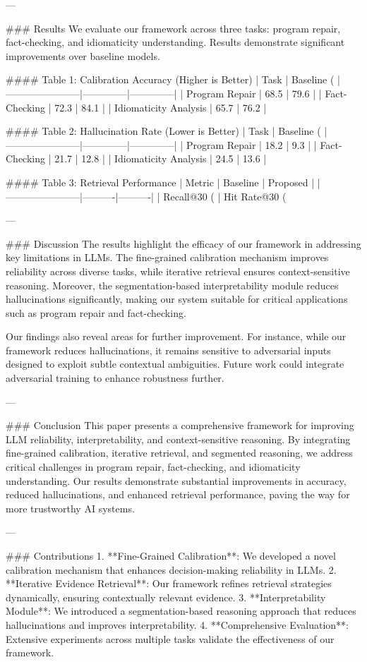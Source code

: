 ---

### Results
We evaluate our framework across three tasks: program repair, fact-checking, and idiomaticity understanding. Results demonstrate significant improvements over baseline models.

#### Table 1: Calibration Accuracy (Higher is Better)
| Task                  | Baseline (%
|-----------------------|--------------|--------------|
| Program Repair        | 68.5         | 79.6         |
| Fact-Checking         | 72.3         | 84.1         |
| Idiomaticity Analysis | 65.7         | 76.2         |

#### Table 2: Hallucination Rate (Lower is Better)
| Task                  | Baseline (%
|-----------------------|--------------|--------------|
| Program Repair        | 18.2         | 9.3          |
| Fact-Checking         | 21.7         | 12.8         |
| Idiomaticity Analysis | 24.5         | 13.6         |

#### Table 3: Retrieval Performance
| Metric                | Baseline | Proposed |
|-----------------------|----------|----------|
| Recall@30 (%
| Hit Rate@30 (%

---

### Discussion
The results highlight the efficacy of our framework in addressing key limitations in LLMs. The fine-grained calibration mechanism improves reliability across diverse tasks, while iterative retrieval ensures context-sensitive reasoning. Moreover, the segmentation-based interpretability module reduces hallucinations significantly, making our system suitable for critical applications such as program repair and fact-checking.

Our findings also reveal areas for further improvement. For instance, while our framework reduces hallucinations, it remains sensitive to adversarial inputs designed to exploit subtle contextual ambiguities. Future work could integrate adversarial training to enhance robustness further.

---

### Conclusion
This paper presents a comprehensive framework for improving LLM reliability, interpretability, and context-sensitive reasoning. By integrating fine-grained calibration, iterative retrieval, and segmented reasoning, we address critical challenges in program repair, fact-checking, and idiomaticity understanding. Our results demonstrate substantial improvements in accuracy, reduced hallucinations, and enhanced retrieval performance, paving the way for more trustworthy AI systems.

---

### Contributions
1. **Fine-Grained Calibration**: We developed a novel calibration mechanism that enhances decision-making reliability in LLMs.
2. **Iterative Evidence Retrieval**: Our framework refines retrieval strategies dynamically, ensuring contextually relevant evidence.
3. **Interpretability Module**: We introduced a segmentation-based reasoning approach that reduces hallucinations and improves interpretability.
4. **Comprehensive Evaluation**: Extensive experiments across multiple tasks validate the effectiveness of our framework.
